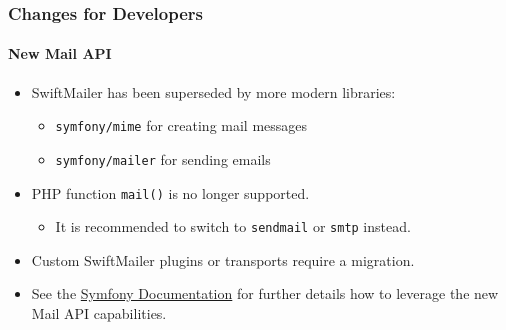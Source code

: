 
\begin{frame}[fragile]
	\frametitle{Changes for Developers}
	\framesubtitle{New Mail API}

	\begin{itemize}
		\item SwiftMailer has been superseded by more modern libraries:

			\begin{itemize}
				\item \texttt{symfony/mime} for creating mail messages
				\item \texttt{symfony/mailer} for sending emails
			\end{itemize}

		\item PHP function \texttt{mail()} is no longer supported.

			\begin{itemize}\smaller
				\item[\ding{228}] It is recommended to switch to \texttt{sendmail} or \texttt{smtp} instead.
			\end{itemize}\normalsize

		\item Custom SwiftMailer plugins or transports require a migration.

		\item See the \href{https://symfony.com/doc/current/mailer.html}{Symfony Documentation}
			for further details how to leverage the new Mail API capabilities.
	\end{itemize}

\end{frame}


